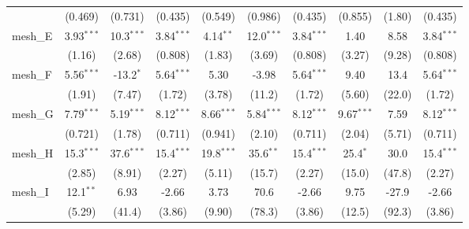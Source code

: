 \begin{tabular}{lccccccccc}
                                                               & (0.469)       & (0.731)       & (0.435)       & (0.549)      & (0.986)       & (0.435)       & (0.855)       & (1.80)         & (0.435)\\   
   mesh\_E                                                     & 3.93$^{***}$  & 10.3$^{***}$  & 3.84$^{***}$  & 4.14$^{**}$  & 12.0$^{***}$  & 3.84$^{***}$  & 1.40          & 8.58           & 3.84$^{***}$\\   
                                                               & (1.16)        & (2.68)        & (0.808)       & (1.83)       & (3.69)        & (0.808)       & (3.27)        & (9.28)         & (0.808)\\   
   mesh\_F                                                     & 5.56$^{***}$  & -13.2$^{*}$   & 5.64$^{***}$  & 5.30         & -3.98         & 5.64$^{***}$  & 9.40          & 13.4           & 5.64$^{***}$\\   
                                                               & (1.91)        & (7.47)        & (1.72)        & (3.78)       & (11.2)        & (1.72)        & (5.60)        & (22.0)         & (1.72)\\   
   mesh\_G                                                     & 7.79$^{***}$  & 5.19$^{***}$  & 8.12$^{***}$  & 8.66$^{***}$ & 5.84$^{***}$  & 8.12$^{***}$  & 9.67$^{***}$  & 7.59           & 8.12$^{***}$\\   
                                                               & (0.721)       & (1.78)        & (0.711)       & (0.941)      & (2.10)        & (0.711)       & (2.04)        & (5.71)         & (0.711)\\   
   mesh\_H                                                     & 15.3$^{***}$  & 37.6$^{***}$  & 15.4$^{***}$  & 19.8$^{***}$ & 35.6$^{**}$   & 15.4$^{***}$  & 25.4$^{*}$    & 30.0           & 15.4$^{***}$\\   
                                                               & (2.85)        & (8.91)        & (2.27)        & (5.11)       & (15.7)        & (2.27)        & (15.0)        & (47.8)         & (2.27)\\   
   mesh\_I                                                     & 12.1$^{**}$   & 6.93          & -2.66         & 3.73         & 70.6          & -2.66         & 9.75          & -27.9          & -2.66\\   
                                                               & (5.29)        & (41.4)        & (3.86)        & (9.90)       & (78.3)        & (3.86)        & (12.5)        & (92.3)         & (3.86)\\   

\end{tabular}
